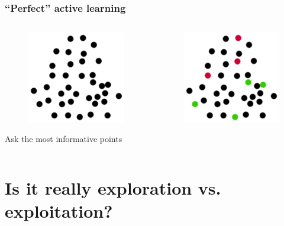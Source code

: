 \documentclass{beamer}
\begin{document}
  \begin{frame}
    \frametitle{``Perfect'' active learning}
    \begin{columns}
      \begin{column}{5cm}
        \begin{figure}
          \includegraphics[scale=.25]{graphics/presentation/clusters2} 
        \end{figure}
        Ask the most informative points\\
      \end{column}
      \begin{column}{5cm}
        \begin{figure}
          \includegraphics[scale=.5]{graphics/presentation/al1} 
        \end{figure}
      \end{column}
    \end{columns}
  \end{frame}


\section{Is it really exploration vs. exploitation?} 
\end{document}
